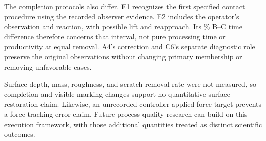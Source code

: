 The completion protocols also differ. E1 recognizes the first specified contact procedure using the recorded observer evidence. E2 includes the operator's observation and reaction, with possible lift and reapproach. Its \BCPercent\% B--C time difference therefore concerns that interval, not pure processing time or productivity at equal removal. A4's correction and C6's separate diagnostic role preserve the original observations without changing primary membership or removing unfavorable cases.

Surface depth, mass, roughness, and scratch-removal rate were not measured, so completion and visible marking changes support no quantitative surface-restoration claim. Likewise, an unrecorded controller-applied force target prevents a force-tracking-error claim. Future process-quality research can build on this execution framework, with those additional quantities treated as distinct scientific outcomes.
